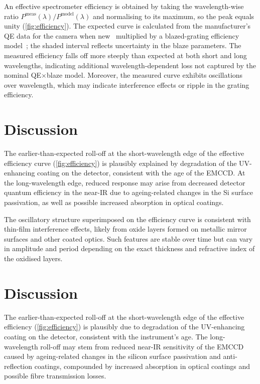 \documentclass[
	parskip=half,
	a4paper,
]{scrarticle}
\begin{document}
An effective spectrometer efficiency is obtained by taking the wavelength-wise ratio \(P^{\text{meas}}(\lambda)/P^{\text{model}}(\lambda)\) and normalising to its maximum, so the peak equals unity (\autoref{fig:efficiency}). The expected curve is calculated from the manufacturer’s QE data for the camera when new~\cite{andor_ixonem_nodate} multiplied by a blazed-grating efficiency model~\cite{barker_ripple_1984}; the shaded interval reflects uncertainty in the blaze parameters. The measured efficiency falls off more steeply than expected at both short and long wavelengths, indicating additional wavelength-dependent loss not captured by the nominal QE\(\times\)blaze model. Moreover, the measured curve exhibits oscillations over wavelength, which may indicate interference effects or ripple in the grating efficiency.


\section{Discussion}
The earlier-than-expected roll-off at the short-wavelength edge of the effective efficiency curve (\autoref{fig:efficiency}) is plausibly explained by degradation of the UV-enhancing coating on the detector, consistent with the age of the EMCCD. At the long-wavelength edge, reduced response may arise from decreased detector quantum efficiency in the near-IR due to ageing-related changes in the Si surface passivation, as well as possible increased absorption in optical coatings. 

The oscillatory structure superimposed on the efficiency curve is consistent with thin-film interference effects, likely from oxide layers formed on metallic mirror surfaces and other coated optics. Such features are stable over time but can vary in amplitude and period depending on the exact thickness and refractive index of the oxidised layers.


\section{Discussion}
The earlier-than-expected roll-off at the short-wavelength edge of the effective efficiency (\autoref{fig:efficiency}) is plausibly due to degradation of the UV-enhancing coating on the detector, consistent with the instrument’s age. The long-wavelength roll-off may stem from reduced near-IR sensitivity of the EMCCD caused by ageing-related changes in the silicon surface passivation and anti-reflection coatings, compounded by increased absorption in optical coatings and possible fibre transmission losses.  
\end{document}
